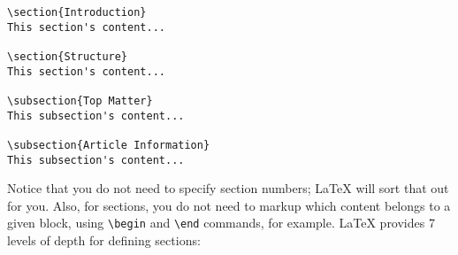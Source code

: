 \begin{lstlisting}
\section{Introduction}
This section's content...

\section{Structure}
This section's content...

\subsection{Top Matter}
This subsection's content...

\subsection{Article Information}
This subsection's content...
\end{lstlisting}


Notice that you do not need to specify section numbers; LaTeX will sort that
out for you. Also, for sections, you do not need to markup which content
belongs to a given block, using \lstinline{\begin} and \lstinline{\end}
commands, for example. LaTeX provides 7 levels of depth for defining sections:

